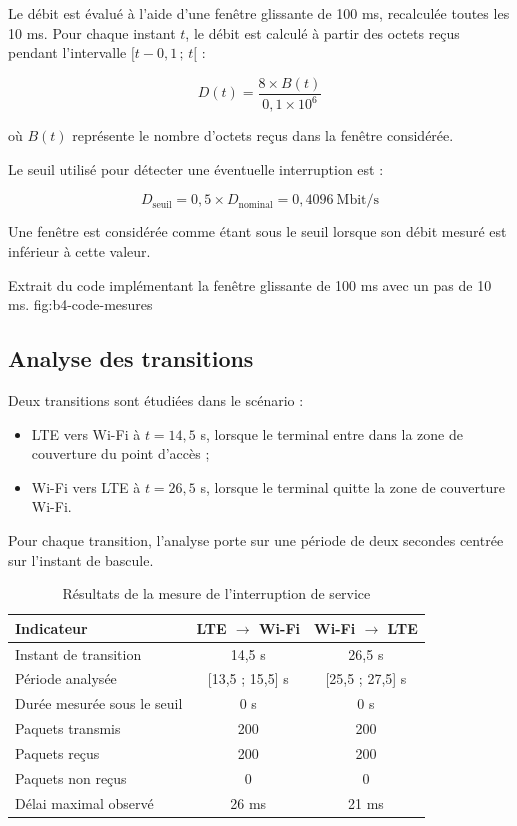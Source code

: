 Le débit est évalué à l'aide d'une fenêtre glissante de 100 ms,
recalculée toutes les 10 ms. Pour chaque instant $t$, le débit est
calculé à partir des octets reçus pendant l'intervalle
$[t-0,1\,;\,t[$ :

\[
D(t)=\frac{8 \times B(t)}{0,1 \times 10^6}
\]

où $B(t)$ représente le nombre d'octets reçus dans la fenêtre
considérée.

Le seuil utilisé pour détecter une éventuelle interruption est :

\[
D_{\text{seuil}}=0,5 \times D_{\text{nominal}}
=0,4096\ \text{Mbit/s}
\]

Une fenêtre est considérée comme étant sous le seuil lorsque
son débit mesuré est inférieur à cette valeur.

{Extrait du code implémentant la fenêtre glissante de 100 ms avec un pas de 10 ms.}
{fig:b4-code-mesures}

\subsection{Analyse des transitions}

Deux transitions sont étudiées dans le scénario :
\begin{itemize}
    \item LTE vers Wi-Fi à $t=14,5$ s, lorsque le terminal entre
    dans la zone de couverture du point d'accès ;
    \item Wi-Fi vers LTE à $t=26,5$ s, lorsque le terminal quitte
    la zone de couverture Wi-Fi.
\end{itemize}

Pour chaque transition, l'analyse porte sur une période de deux
secondes centrée sur l'instant de bascule.

\begin{table}[H]
    \centering
    \caption{Résultats de la mesure de l'interruption de service}
    \label{tab:b4-interruption}
    \begin{tabular}{|l|c|c|}
        \hline
        \textbf{Indicateur} & \textbf{LTE $\rightarrow$ Wi-Fi}
        & \textbf{Wi-Fi $\rightarrow$ LTE} \\
        \hline
        Instant de transition & 14,5 s & 26,5 s \\
        \hline
        Période analysée & [13,5 ; 15,5] s & [25,5 ; 27,5] s \\
        \hline
        Durée mesurée sous le seuil & 0 s & 0 s \\
        \hline
        Paquets transmis & 200 & 200 \\
        \hline
        Paquets reçus & 200 & 200 \\
        \hline
        Paquets non reçus & 0 & 0 \\
        \hline
        Délai maximal observé & 26 ms & 21 ms \\
        \hline
    \end{tabular}
\end{table}

